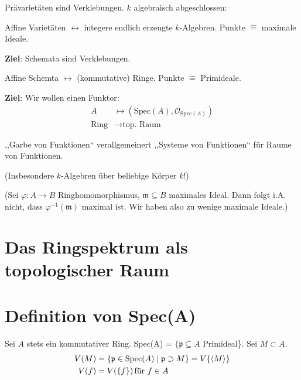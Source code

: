Prävarietäten sind Verklebungen. $k$ algebraisch abgeschlossen:

Affine Varietäten $\leftrightarrow$ integere endlich erzeugte
$k$-Algebren.  Punkte $\hat{=}$ maximale Ideale.

\textbf{Ziel}: Schemata sind Verklebungen.

Affine Schemta $\leftrightarrow$ (kommutative) Ringe. Punkte $\hat{=}$
Primideale.

\textbf{Ziel}: Wir wollen einen Funktor:
\begin{align*}
  A & \longmapsto(\text{Spec}(A),\mathcal{O}_{\text{Spec}(A)})\\
  \text{Ring} & \longrightarrow\text{top. Raum}
\end{align*}

,,Garbe von Funktionen`` verallgemeinert ,,Systeme von Funktionen``
für Raume von Funktionen.

(Insbesondere $k$-Algebren über beliebige Körper $k$!)

(Sei $\varphi:A\rightarrow B$ Ringhomomorphismus,
$\mathfrak{m}\subseteq B$ maximales Ideal. Dann folgt i.A. nicht, dass
$\varphi^{-1}(\mathfrak{m})$ maximal ist. Wir haben also zu wenige
maximale Ideale.)

\section*{Das Ringspektrum als topologischer Raum}

\section{Definition von Spec(A)}

Sei $A$ stets ein kommutativer Ring. Spec(A) =
$\{\mathfrak{p}\subseteq A$ Primideal\}. Sei $M\subset A$.
\begin{align*}
  V(M) & =\{\mathfrak{p}\in\text{Spec}(A)\mid\mathfrak{p}\supset
         M\}=V\{\langle M\rangle\}\\
  V(f) & =V(\{f\})\text{\,für }f\in A
\end{align*}

